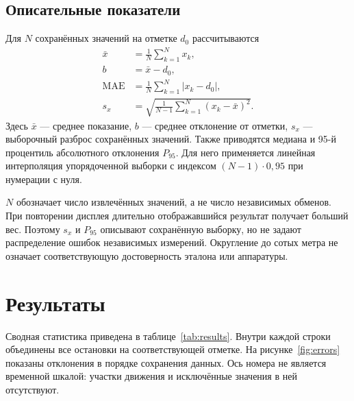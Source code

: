 \documentclass{misisarticle}
\begin{document}
\subsection{Описательные показатели}

Для $N$ сохранённых значений на отметке $d_0$ рассчитываются
\begin{align}
\bar{x}&=\frac{1}{N}\sum_{k=1}^{N}x_k,\\
b&=\bar{x}-d_0,\\
\mathrm{MAE}&=\frac{1}{N}\sum_{k=1}^{N}|x_k-d_0|,\\
s_x&=\sqrt{\frac{1}{N-1}\sum_{k=1}^{N}(x_k-\bar{x})^2}.
\end{align}
Здесь $\bar{x}$ --- среднее показание, $b$ --- среднее отклонение от отметки, $s_x$ --- выборочный разброс сохранённых значений. Также приводятся медиана и 95-й процентиль абсолютного отклонения $P_{95}$. Для него применяется линейная интерполяция упорядоченной выборки с индексом $(N-1)\cdot0{,}95$ при нумерации с нуля.

$N$ обозначает число извлечённых значений, а не число независимых обменов. При повторении дисплея длительно отображавшийся результат получает больший вес. Поэтому $s_x$ и $P_{95}$ описывают сохранённую выборку, но не задают распределение ошибок независимых измерений. Округление до сотых метра не означает соответствующую достоверность эталона или аппаратуры.

\section{Результаты}

Сводная статистика приведена в таблице~\ref{tab:results}. Внутри каждой строки объединены все остановки на соответствующей отметке. На рисунке~\ref{fig:errors} показаны отклонения в порядке сохранения данных. Ось номера не является временной шкалой: участки движения и исключённые значения в ней отсутствуют.
\end{document}
